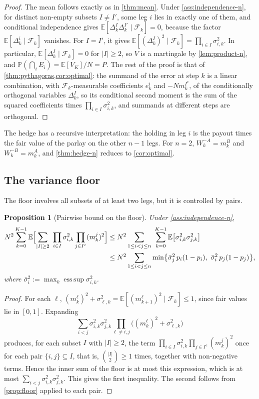 \documentclass[11pt,a4paper]{article}
\theoremstyle{plain}
\newtheorem{proposition}[theorem]{Proposition}
\theoremstyle{definition}
\theoremstyle{remark}
\newcommand{\E}{\mathbb{E}}
\newcommand{\Prob}{\mathbb{P}}
\newcommand{\1}{\mathbf{1}}
\newcommand{\F}{\mathcal{F}}
\begin{document}
\begin{proof}
The mean follows exactly as in \cref{thm:mean}. Under \cref{ass:independence-n}, for distinct non-empty subsets $I\neq I'$, some leg $i$ lies in exactly one of them, and conditional independence gives $\E[\Delta^I_k\Delta^{I'}_k\mid\F_k] = 0$, because the factor $\E[\Delta^i_k\mid\F_k]$ vanishes. For $I=I'$, it gives $\E[(\Delta^I_k)^2\mid\F_k] = \prod_{i\in I}\sigma^2_{i,k}$. In particular, $\E[\Delta^I_k\mid\F_k] = 0$ for $|I|\geq 2$, so $V$ is a martingale by \cref{lem:product-n}, and $\Prob(\bigcap_iE_i) = \E[V_K]/N = P$. The rest of the proof is that of \cref{thm:pythagoras,cor:optimal}: the summand of the error at step $k$ is a linear combination, with $\F_k$-measurable coefficients $e^i_k$ and $-Nm^{I^c}_k$, of the conditionally orthogonal variables $\Delta^I_k$, so its conditional second moment is the sum of the squared coefficients times $\prod_{i\in I}\sigma^2_{i,k}$, and summands at different steps are orthogonal.
\end{proof}

The hedge has a recursive interpretation: the holding in leg $i$ is the payout times the fair value of the parlay on the other $n-1$ legs. For $n=2$, $W^{-A}_k = m^B_k$ and $W^{-B}_k = m^A_k$, and \cref{thm:hedge-n} reduces to \cref{cor:optimal}.

\subsection{The variance floor}

The floor involves all subsets of at least two legs, but it is controlled by pairs.

\begin{proposition}[Pairwise bound on the floor]
\label{prop:floor-n}
Under \cref{ass:independence-n},
\begin{align*}
N^2\sum_{k=0}^{K-1}\E\Bigl[\sum_{|I|\geq 2}\ \prod_{i\in I}\sigma^2_{i,k}\prod_{j\in I^c}(m^j_k)^2\Bigr]
&\leq N^2\sum_{1\leq i<j\leq n}\ \sum_{k=0}^{K-1}\E\bigl[\sigma^2_{i,k}\sigma^2_{j,k}\bigr]\\
&\leq N^2\sum_{1\leq i<j\leq n}\min\bigl\{\bar\sigma^2_j\,p_i(1-p_i),\ \bar\sigma^2_i\,p_j(1-p_j)\bigr\},
\end{align*}
where $\bar\sigma^2_i := \max_k\operatorname{ess\,sup}\sigma^2_{i,k}$.
\end{proposition}

\begin{proof}
For each $\ell$, $(m^\ell_k)^2+\sigma^2_{\ell,k} = \E[(m^\ell_{k+1})^2\mid\F_k]\leq 1$, since fair values lie in $[0,1]$. Expanding
\[
\sum_{i<j}\sigma^2_{i,k}\sigma^2_{j,k}\prod_{\ell\neq i,j}\bigl((m^\ell_k)^2+\sigma^2_{\ell,k}\bigr)
\]
produces, for each subset $I$ with $|I|\geq 2$, the term $\prod_{i\in I}\sigma^2_{i,k}\prod_{j\in I^c}(m^j_k)^2$ once for each pair $\{i,j\}\subseteq I$, that is, $\binom{|I|}{2}\geq 1$ times, together with non-negative terms. Hence the inner sum of the floor is at most this expression, which is at most $\sum_{i<j}\sigma^2_{i,k}\sigma^2_{j,k}$. This gives the first inequality. The second follows from \cref{prop:floor} applied to each pair.
\end{proof}
\end{document}
